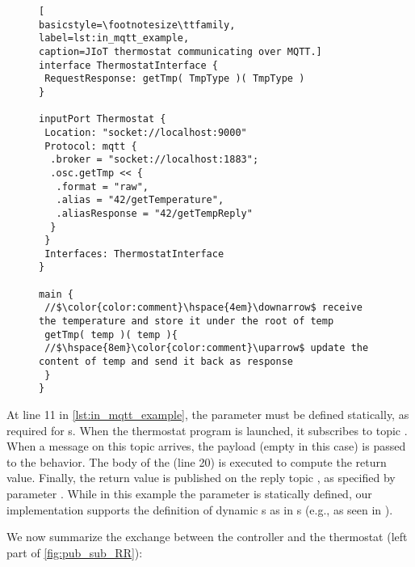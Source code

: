 \begin{figure}[t]
\begin{lstlisting}[
basicstyle=\footnotesize\ttfamily,
label=lst:in_mqtt_example,
caption=JIoT thermostat communicating over MQTT.]
interface ThermostatInterface {
 RequestResponse: getTmp( TmpType )( TmpType )
}

inputPort Thermostat {
 Location: "socket://localhost:9000"
 Protocol: mqtt {
  .broker = "socket://localhost:1883";
  .osc.getTmp << {
   .format = "raw",
   .alias = "42/getTemperature",
   .aliasResponse = "42/getTempReply"
  }
 }
 Interfaces: ThermostatInterface 
}

main {
 //$\color{color:comment}\hspace{4em}\downarrow$ receive the temperature and store it under the root of temp
 getTmp( temp )( temp ){
 //$\hspace{8em}\color{color:comment}\uparrow$ update the content of temp and send it back as response 
 }
}
\end{lstlisting}
\end{figure}

At line 11 in \cref{lst:in_mqtt_example}, the  parameter
must be defined statically, as required for s.
When the thermostat program is launched, it subscribes to topic
. When a message on this topic arrives, the payload
(empty in this case) is passed to the behavior. The body of the
 (line 20) is executed to compute the return value.
Finally, the return value is published on the reply topic
, as specified by  parameter
. While in this example the parameter
 is statically defined, our implementation supports the
definition of dynamic s as in s (e.g.,
as seen in ).

We now summarize the exchange between the controller and the thermostat (left
part of \cref{fig:pub_sub_RR}):

